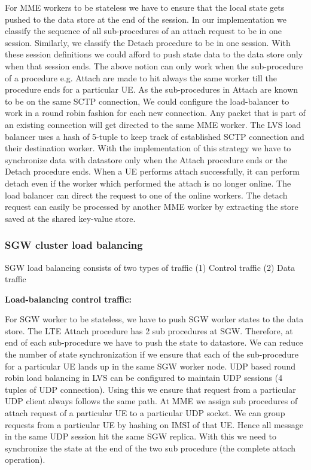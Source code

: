 \documentclass[hidelinks]{report}
\begin{document}
For MME workers to be stateless we have to ensure that the local state gets pushed to the data store at the end of the session. In our implementation we classify the sequence of all sub-procedures of an attach request to be in one session. Similarly, we classify the Detach procedure to be in one session. With these session definitions we could afford to push state data to the data store only when that session ends. The above notion can only work when the sub-procedure of a procedure e.g. Attach are made to hit always the same worker till the procedure ends for a particular UE. As the sub-procedures in Attach are known to be on the same SCTP connection, We could configure the load-balancer to work in a round robin fashion for each new connection. Any packet that is part of an existing connection will get directed to the same MME worker. The LVS load balancer uses a hash of 5-tuple to keep track of established SCTP connection and their destination worker. With the implementation of this strategy we have to synchronize data with datastore only when the Attach procedure ends or the Detach procedure ends. When a UE performs attach successfully, it can perform detach even if the worker which performed the attach is no longer online. The load balancer can direct the request to one of the online workers. The detach request can easily be processed by another MME worker by extracting the store saved at the shared key-value store.


\subsubsection{\textbf{SGW cluster load balancing}}
SGW load balancing consists of two types of traffic (1) Control traffic (2) Data traffic

\textbf{Load-balancing control traffic:}

For SGW worker to be stateless, we have to push SGW worker states to the data store. The LTE Attach procedure has 2 sub procedures at SGW. Therefore, at end of each sub-procedure we have to push the state to datastore. We can reduce the number of state synchronization if we ensure that each of the sub-procedure for a particular UE lands up in the same SGW worker node. UDP based round robin load balancing in LVS can be configured to maintain UDP sessions (4 tuples of UDP connection). Using this we ensure that request from a particular UDP client always follows the same path. At MME we assign sub procedures of attach request of a particular UE to a particular UDP socket. We can group requests from a particular UE by hashing on IMSI of that UE. Hence all message in the same UDP session hit the same SGW replica. With this we need to synchronize the state at the end of the two sub procedure (the complete attach operation).
\end{document}
